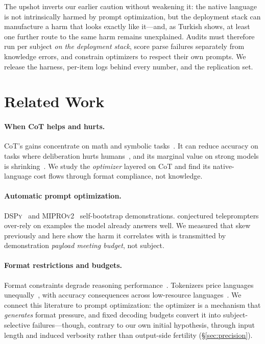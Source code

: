 \documentclass[11pt]{article}
\begin{document}
The upshot inverts our earlier caution without weakening it: the native language is
not intrinsically harmed by prompt optimization, but the deployment stack can
manufacture a harm that looks exactly like it---and, as Turkish shows, at least one
further route to the same harm remains unexplained. Audits must therefore run per
subject \emph{on the deployment stack}, score parse failures separately from knowledge
errors, and constrain optimizers to respect their own prompts. We release the harness,
per-item logs behind every number, and the replication set.

\section{Related Work}\label{sec:related}
\paragraph{When CoT helps and hurts.} CoT's gains concentrate on math and symbolic
tasks~\citep{sprague2025cot}. It can reduce accuracy on tasks where deliberation hurts
humans~\citep{liu2025mind}, and its marginal value on strong models is
shrinking~\citep{meincke2025decreasing}. We study the \emph{optimizer} layered on CoT
and find its native-language cost flows through format compliance, not knowledge.
\paragraph{Automatic prompt optimization.} \textsc{DSPy}~\citep{khattab2024dspy} and
\textsc{MIPROv2}~\citep{opsahlong2024mipro} self-bootstrap demonstrations.
\citet{sarmah2024} conjectured teleprompters over-rely on examples the model already
answers well. We measured that skew previously and here show the harm it correlates
with is transmitted by demonstration \emph{payload meeting budget}, not subject.
\paragraph{Format restrictions and budgets.} Format constraints degrade reasoning
performance~\citep{tam2024format}. Tokenizers price languages
unequally~\citep{petrov2023tokenizer}, with accuracy consequences across low-resource
languages~\citep{lundin2025tokentax}. We connect this literature to prompt
optimization: the optimizer is a mechanism that \emph{generates} format pressure, and
fixed decoding budgets convert it into subject-selective failures---though, contrary
to our own initial hypothesis, through input length and induced verbosity rather than
output-side fertility (\S\ref{sec:precision}).
\end{document}

